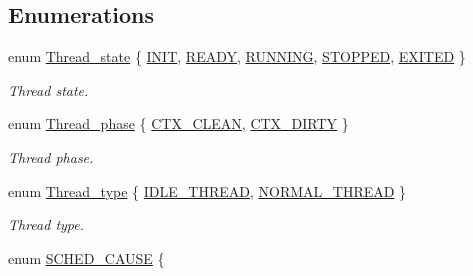 \subsection*{Enumerations}
\begin{DoxyCompactItemize}
\item 
enum \hyperlink{group__scheduler_ga6c969c169777f82c104cf73e501df70f}{Thread\+\_\+state} \{ \newline
\hyperlink{group__scheduler_gga6c969c169777f82c104cf73e501df70fa0cb1b2c6a7db1f1084886c98909a3f36}{I\+N\+IT}, 
\hyperlink{group__scheduler_gga6c969c169777f82c104cf73e501df70fa6564f2f3e15be06b670547bbcaaf0798}{R\+E\+A\+DY}, 
\hyperlink{group__scheduler_gga6c969c169777f82c104cf73e501df70fa1061be6c3fb88d32829cba6f6b2be304}{R\+U\+N\+N\+I\+NG}, 
\hyperlink{group__scheduler_gga6c969c169777f82c104cf73e501df70fa948b2aee15f52b421fa4770c47bcfe8c}{S\+T\+O\+P\+P\+ED}, 
\newline
\hyperlink{group__scheduler_gga6c969c169777f82c104cf73e501df70fab9f9543350f6bd6191e52158daa88884}{E\+X\+I\+T\+ED}
 \}\begin{DoxyCompactList}\small\item\em Thread state. \end{DoxyCompactList}
\item 
enum \hyperlink{group__scheduler_gab180b4aa356776bddcd724cef4f5deae}{Thread\+\_\+phase} \{ \hyperlink{group__scheduler_ggab180b4aa356776bddcd724cef4f5deaeaa826daca588e692c88114586b0de472b}{C\+T\+X\+\_\+\+C\+L\+E\+AN}, 
\hyperlink{group__scheduler_ggab180b4aa356776bddcd724cef4f5deaea2b4b41fda67c1a83e6523675515c007b}{C\+T\+X\+\_\+\+D\+I\+R\+TY}
 \}\begin{DoxyCompactList}\small\item\em Thread phase. \end{DoxyCompactList}
\item 
enum \hyperlink{group__scheduler_ga18795bc1ab00161fc27ce34b1895fb03}{Thread\+\_\+type} \{ \hyperlink{group__scheduler_gga18795bc1ab00161fc27ce34b1895fb03abc11b4e4eba50c875d7ed6bc34090dd3}{I\+D\+L\+E\+\_\+\+T\+H\+R\+E\+AD}, 
\hyperlink{group__scheduler_gga18795bc1ab00161fc27ce34b1895fb03a1d3bb8be1deb6ac7be94fea88e1ed76b}{N\+O\+R\+M\+A\+L\+\_\+\+T\+H\+R\+E\+AD}
 \}\begin{DoxyCompactList}\small\item\em Thread type. \end{DoxyCompactList}
\item 
enum \hyperlink{group__scheduler_gaad787d8d80312ffca3c0f197b3a25fbe}{S\+C\+H\+E\+D\+\_\+\+C\+A\+U\+SE} \{ \newline

\end{DoxyCompactItemize}
